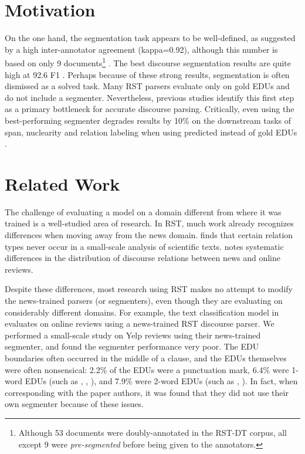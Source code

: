 \section{Motivation}
On the one hand, the segmentation task appears to be well-defined, as suggested by a high inter-annotator agreement (kappa=0.92), although this number is based on only 9 documents\footnote{Although 53 documents were doubly-annotated in the RST-DT corpus, all except 9 were \emph{pre-segmented} before being given to the annotators.} \cite{Carlson:2001}.
The best discourse segmentation results are quite high at 92.6 F1 \cite{Feng:2015}. Perhaps because of these strong results, segmentation is often dismissed as a solved task. Many RST parsers evaluate only on gold EDUs and do not include a segmenter. Nevertheless, previous studies \cite{Soricut:2003,Fisher:2007,Joty:2015,Feng:2015} identify this first step as a primary bottleneck for accurate discourse parsing. Critically, even using the best-performing segmenter degrades results by 10\% on the downstream tasks of span, nuclearity and relation labeling when using predicted instead of gold EDUs \cite{Feng:2015}.

\section{Related Work}
The challenge of evaluating a model on a domain different from where it was trained is a well-studied area of research. 
In RST, much work already recognizes differences when moving away from the news domain.  finds that certain relation types never occur in a small-scale analysis of scientific texts.  notes systematic differences in the distribution of discourse relations between news and online reviews. 

Despite these differences, most research using RST makes no attempt to modify the news-trained parsers (or segmenters), even though they are evaluating on considerably different domains. 
For example, the text classification model in  evaluates on online reviews using a news-trained RST discourse parser. We performed a small-scale study on Yelp reviews using their news-trained segmenter, and found the segmenter performance very poor. The EDU boundaries often occurred in the middle of a clause, and the EDUs themselves were often nonsensical: 2.2\% of the EDUs were a punctuation mark, 6.4\% were 1-word EDUs (such as , , ), and 7.9\% were 2-word EDUs (such as , ). In fact, when corresponding with the paper authors, it was found that they did not use their own segmenter because of these issues.

